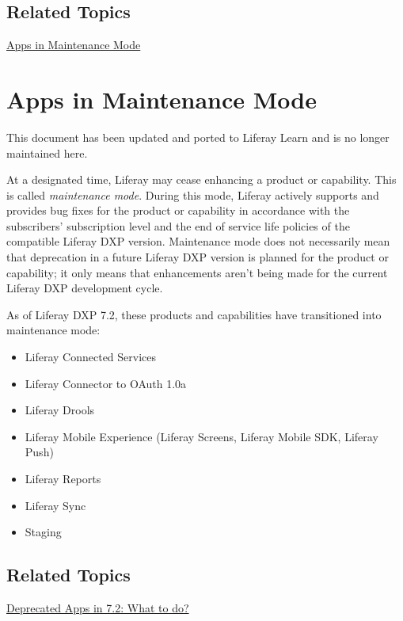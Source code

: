 \noindent\hrulefill

\section{Related Topics}\label{related-topics-7}

\href{/docs/7-2/deploy/-/knowledge_base/d/apps-in-maintenance-mode}{Apps
in Maintenance Mode}

\chapter{Apps in Maintenance Mode}\label{apps-in-maintenance-mode}

{This document has been updated and ported to Liferay Learn and is no
longer maintained here.}

At a designated time, Liferay may cease enhancing a product or
capability. This is called \emph{maintenance mode}. During this mode,
Liferay actively supports and provides bug fixes for the product or
capability in accordance with the subscribers' subscription level and
the end of service life policies of the compatible Liferay DXP version.
Maintenance mode does not necessarily mean that deprecation in a future
Liferay DXP version is planned for the product or capability; it only
means that enhancements aren't being made for the current Liferay DXP
development cycle.

As of Liferay DXP 7.2, these products and capabilities have transitioned
into maintenance mode:

\begin{itemize}
\tightlist
\item
  Liferay Connected Services
\item
  Liferay Connector to OAuth 1.0a
\item
  Liferay Drools
\item
  Liferay Mobile Experience (Liferay Screens, Liferay Mobile SDK,
  Liferay Push)
\item
  Liferay Reports
\item
  Liferay Sync
\item
  Staging
\end{itemize}

\section{Related Topics}\label{related-topics-8}

\href{/docs/7-2/deploy/-/knowledge_base/d/deprecated-apps-in-7-2-what-to-do}{Deprecated
Apps in 7.2: What to do?}

